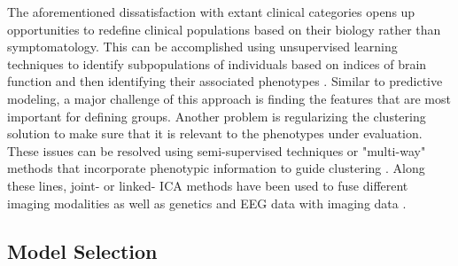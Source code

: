 \documentclass{bmcart}
\begin{document}
The aforementioned dissatisfaction with extant clinical categories opens up opportunities to redefine clinical populations based on their biology rather than symptomatology. This can be accomplished using unsupervised learning techniques to identify subpopulations of individuals based on indices of brain function and then identifying their associated phenotypes \cite{Gates2014}. Similar to predictive modeling, a major challenge of this approach is finding the features that are most important for defining groups. Another problem is regularizing the clustering solution to make sure that it is relevant to the phenotypes under evaluation. These issues can be resolved using semi-supervised techniques or "multi-way" methods that incorporate phenotypic information to guide clustering \cite{Morup2011}. Along these lines, joint- or linked- ICA methods have been used to fuse different imaging modalities \cite{Franco2008, Groves2011} as well as genetics and EEG data with imaging data \cite{Calhoun2009}. 

\subsection{Model Selection}
\end{document}
